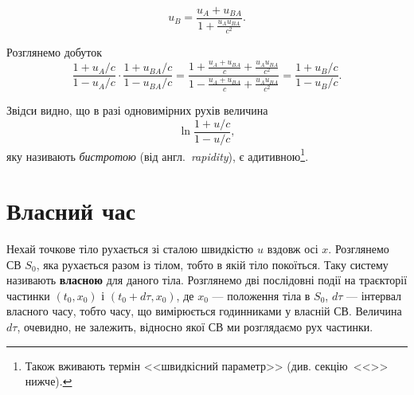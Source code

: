 \begin{equation*}
    u_B=\frac{u_A+u_{BA}}{1+\frac{u_Au_{BA}}{c^2}}.
\end{equation*}


Розглянемо добуток
\begin{equation*}
    \frac{1+u_A/c}{1-u_A/c}\cdot \frac{1+u_{BA}/c}{1-u_{BA}/c}=\frac{1+\frac{u_A+u_{BA}}{c}+\frac{u_Au_{BA}}{c^2}}{1-\frac{u_A+u_{BA}}{c}+\frac{u_Au_{BA}}{c^2}}=\frac{1+u_B/c}{1-u_B/c}.
\end{equation*}


Звідси видно, що в разі одновимірних рухів величина
\begin{equation}
    \ln \frac{1+u/c}{1-u/c},
\end{equation}
яку називають \emph{бистротою} (від англ.\ \emph{rapidity}), є
адитивною\footnote{Також вживають термін <<швидкісний параметр>> (див.
секцію~<<>> нижче).}.


\section{Власний час}\label{sec:proper_time}

Нехай точкове тіло рухається зі сталою швидкістю $u$ вздовж осі $x$. Розглянемо СВ $S_0$, яка рухається разом із тілом,
тобто в якій тіло покоїться. Таку систему називають \textbf{власною} для даного тіла. Розглянемо дві послідовні події на
траєкторії частинки $(t_0,x_0)$ і $(t_0+d\tau, x_0)$, де $x_0$ --- положення тіла в $S_0$, $d\tau $ --- інтервал
власного часу, тобто часу, що вимірюється годинниками у власній СВ. Величина $d\tau $, очевидно, не залежить, відносно
якої СВ ми розглядаємо рух частинки.

